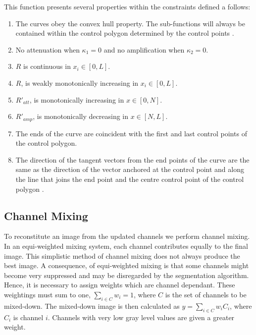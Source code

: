 \begin{definition}
This function presents several properties within the constraints defined a follows:
\begin{enumerate}
	\item
	The curves obey the convex hull property. The sub-functions will always be contained within the control polygon determined by the control points \citep{Vince2006,Marsh2005}.
	
	\item
	No attenuation when $\kappa_1=0$ and no amplification when $\kappa_2=0$.
	
	\item
	$R$ is continuous in $x_i \in [0,L]$.
	
	\item
	$R$, is weakly monotonically increasing in $x_i \in [0,L]$.
	
	\item
	$R'_{att}$, is monotonically increasing in $x \in [0, N]$.
	
	\item
	$R'_{amp}$, is monotonically decreasing in $x \in [N, L]$.
	
	\item
	The ends of the curve are coincident with the first and last control points of the control polygon.
	
	\item
	The direction of the tangent vectors from the end points of the curve are the same as the direction of the vector anchored at the control point and along the line that joins the end point and the centre control point of the control polygon \citep{Vince2006,Marsh2005}.
\end{enumerate}
\end{definition}



\subsection{Channel Mixing}
\label{sec:channelmixing}

To reconstitute an image from the updated channels we perform channel mixing. In an equi-weighted mixing system, each channel contributes equally to the final image. This simplistic method of channel mixing does not always produce the best image.
A consequence, of equi-weighted mixing is that some channels might become very suppressed and may be disregarded by the segmentation algorithm. Hence, it is necessary to assign weights which are channel dependant. These weightings must sum to one, $\sum_{i \in C} w_i = 1$, where $C$ is the set of channels to be mixed-down. The mixed-down image is then calculated as $y = \sum_{i \in C}w_iC_i$, where $C_i$ is channel $i$. Channels with very low gray level values are given a greater weight.

